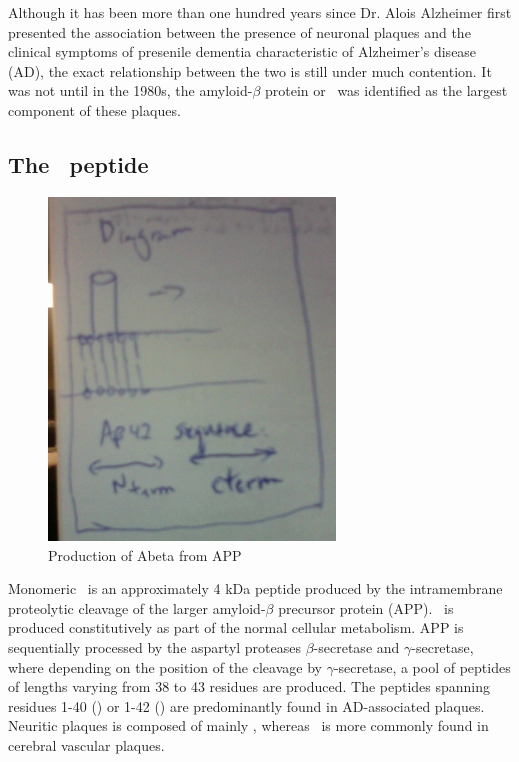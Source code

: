 Although it has been more than one hundred years since Dr. Alois Alzheimer first presented the association between the presence of neuronal plaques and the clinical symptoms of presenile dementia characteristic of Alzheimer's disease (AD), the exact relationship between the two is still under much contention.  It was not until in the 1980s, the amyloid-$\beta$ protein or \abeta\ was identified as the largest component of these plaques.

\subsection{The \abeta\ peptide}

\begin{figure}
\centering
\includegraphics[width=3in]{figures/introduction/AD_abeta_app.png}
\caption[Abeta production]{Production of Abeta from APP}
\label{fig:AD_abeta_app}
\end{figure}

Monomeric \abeta\ is an approximately 4 kDa peptide produced by the intramembrane proteolytic cleavage of the larger amyloid-$\beta$ precursor protein (APP).  \abeta\ is produced constitutively as part of the normal cellular metabolism.\cite{Hardy:2002dh} APP is sequentially processed by the aspartyl proteases $\beta$-secretase and $\gamma$-secretase, where depending on the position of the cleavage by $\gamma$-secretase, a pool of \abeta peptides of lengths varying from 38 to 43 residues are produced. The peptides spanning residues 1-40 (\abetaforty) or 1-42 (\abetafortytwo) are predominantly found in AD-associated plaques. Neuritic plaques is composed of mainly \abetafortytwo, whereas \abetaforty\ is more commonly found in cerebral vascular plaques.


